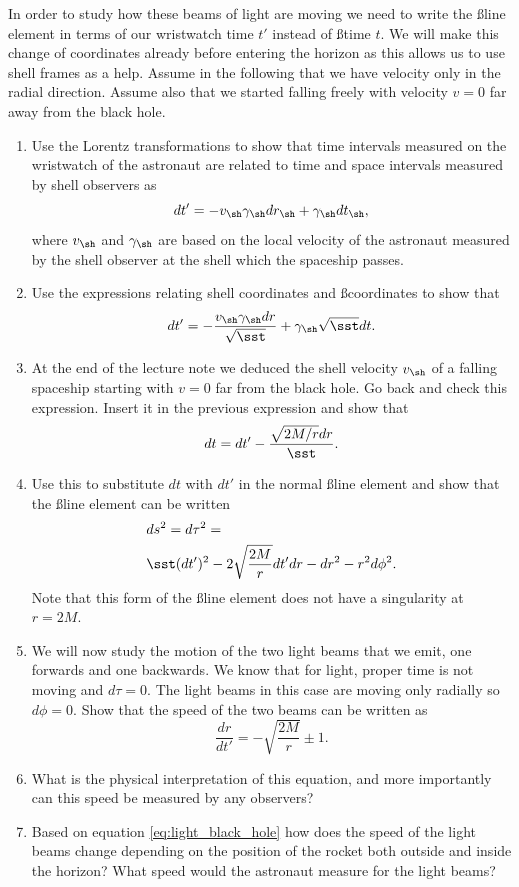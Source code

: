 {\begin{multicols}{2}
In order to study how these beams of light are moving we need to write the \ss line element in terms of our wristwatch time $t'$ instead of \ss time $t$. We will make this change of coordinates already before entering the horizon as this allows us to use shell frames as a help. Assume in the following that we have velocity only in the radial direction. Assume also that we started falling freely with velocity $v=0$ far away from the black hole.
\begin{enumerate}
\item Use the Lorentz transformations to show that time intervals measured on the wristwatch of the astronaut are related to time and space intervals measured by shell observers as
\[
dt'=-v_\sh\gamma_\sh dr_\sh+\gamma_\sh dt_\sh,
\]
where $v_\sh$ and $\gamma_\sh$ are based on the local velocity of the astronaut measured by the shell observer at the shell which the spaceship passes. 
\item Use the expressions relating shell coordinates and \ss coordinates to show that
\[
dt'=-\frac{v_\sh\gamma_\sh dr}{\sqrt{\sst}}+\gamma_\sh\sqrt{\sst}dt.
\]
\item At the end of the lecture note we deduced the shell velocity $v_\sh$ of a falling spaceship starting with $v=0$ far from the black hole. Go back and check this expression. Insert it in the previous expression and show that
\[
dt=dt'-\frac{\sqrt{2M/r}dr}{\sst}.
\]
\item Use this to substitute $dt$ with $dt'$ in the normal \ss line element and show that the \ss line element can be written
\begin{align*}
&ds^2=d\tau^2=\\
&\sst(dt')^2-2\sqrt{\frac{2M}{r}}dt'dr-dr^2-r^2d\phi^2.
\end{align*}
Note that this form of the \ss line element does not have a singularity at $r=2M$.
\item We will now study the motion of the two light beams that we emit, one forwards and one backwards. We know that for light, proper time is not moving and $d\tau=0$. The light beams in this case are moving only radially so $d\phi=0$. Show that the speed of the two beams can be written as
\begin{equation} \label{eq:light_black_hole}
\frac{dr}{dt'}=-\sqrt{\frac{2M}{r}}\pm1.
\end{equation}
\item What is the physical interpretation of this equation, and more importantly can this speed be measured by any observers?
\item Based on equation \ref{eq:light_black_hole} how does the speed of the light beams change depending on the position of the rocket both outside and inside the horizon? What speed would the astronaut measure for the light beams?

\end{enumerate}
\end{multicols}}

